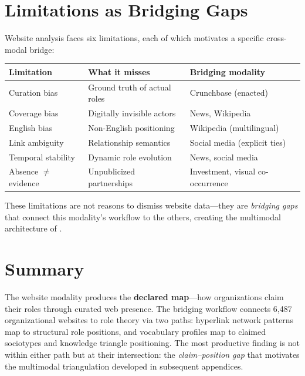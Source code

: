 \documentclass[../main.tex]{subfiles}
\begin{document}
\section{Limitations as Bridging Gaps}
\label{sec:websites-limitations}

Website analysis faces six limitations,
each of which motivates a specific cross-modal bridge:

\tableminimal
\begin{center}
\begin{tabular}{@{}p{3cm}p{4cm}p{4cm}@{}}
\toprule
\textbf{Limitation} & \textbf{What it misses} & \textbf{Bridging modality} \\
\midrule
Curation bias & Ground truth of actual roles & Crunchbase (enacted) \\
Coverage bias & Digitally invisible actors & News, Wikipedia \\
English bias & Non-English positioning & Wikipedia (multilingual) \\
Link ambiguity & Relationship semantics & Social media (explicit ties) \\
Temporal stability & Dynamic role evolution & News, social media \\
Absence $\neq$ evidence & Unpublicized partnerships & Investment, visual co-occurrence \\
\bottomrule
\end{tabular}
\end{center}

These limitations are not reasons to dismiss website data---they are
\emph{bridging gaps} that connect this modality's workflow to the others,
creating the multimodal architecture of \RoleBox{}.


\section{Summary}

\begin{summarybox}
The website modality produces the \textbf{declared map}---how organizations
claim their roles through curated web presence.
The bridging workflow connects 6,487 organizational websites to role theory
via two paths: hyperlink network patterns map to structural role positions,
and vocabulary profiles map to claimed sociotypes and knowledge triangle
positioning.
The most productive finding is not within either path but at
their intersection: the \emph{claim--position gap} that motivates
the multimodal triangulation developed in subsequent appendices.
\end{summarybox}

\clearpage
{}
\end{document}
